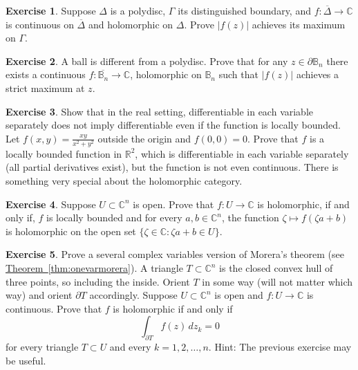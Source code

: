 \documentclass[12pt,openany]{book}
\newcommand{\sabs}[1]{\lvert {#1} \rvert}
\newcommand{\C}{{\mathbb{C}}}
\newcommand{\R}{{\mathbb{R}}}
\newcommand{\bB}{{\mathbb{B}}}
\theoremstyle{plain}
\theoremstyle{remark}
\theoremstyle{definition}
\newenvironment{exbox}{%
    \def\FrameCommand{\vrule width 1pt \relax\hspace {10pt}}%
    \MakeFramed {\advance \hsize -\width \FrameRestore }%
}{%
    \endMakeFramed
}
\theoremstyle{exercise}
\newtheorem{exercise}{Exercise}[section]
\theoremstyle{example}
\newcommand{\thmref}[1]{\hyperref[#1]{Theorem~\ref*{#1}}}
\begin{document}
\begin{exbox}
\begin{exercise}
Suppose $\Delta$ is a polydisc, $\Gamma$ its distinguished boundary,
and $f \colon \overline{\Delta} \to \C$ is continuous on $\overline{\Delta}$
and holomorphic on $\Delta$.
Prove
$\sabs{f(z)}$ achieves its maximum on $\Gamma$.
\end{exercise}

\begin{exercise}
A ball is different from a polydisc.  Prove that for any $z \in \partial \bB_n$
there exists a continuous $f \colon \overline{\bB_n} \to \C$, holomorphic
on $\bB_n$ such that $\sabs{f(z)}$ achieves a strict maximum at $z$.
\end{exercise}

\begin{exercise}
Show that in the real setting, differentiable
in each variable separately does not imply differentiable even if
the function is locally bounded.
Let $f(x,y) = \frac{xy}{x^2+y^2}$ outside the origin
and $f(0,0) = 0$.  Prove that $f$ is a
locally bounded function in $\R^2$, which is differentiable
in each variable separately (all partial derivatives exist), but 
the function is not even continuous.  There is something very
special about the holomorphic category.
\end{exercise}

\begin{exercise}
Suppose $U \subset \C^n$ is open.
Prove that $f \colon U \to \C$ is holomorphic, if and only if,
$f$ is locally bounded and
for every $a,b \in \C^n$, the
function
$\zeta \mapsto f(\zeta a + b)$ is holomorphic on
the open set $\{ \zeta \in \C : \zeta a + b \in U \}$.
\end{exercise}

\begin{exercise}
Prove a several complex variables version of Morera's theorem (see
\thmref{thm:onevarmorera}).
A triangle $T \subset \C^n$ is the closed convex hull of three points, so
including the inside.  Orient $T$ in some way (will not matter which way)
and orient $\partial T$ accordingly.
Suppose $U \subset \C^n$ is open and $f \colon U \to \C$ is continuous.
Prove that $f$ is holomorphic if and only if
\begin{equation*}
\int_{\partial T} f(z) \, dz_k = 0
\end{equation*}
for every triangle $T \subset U$ and every $k=1,2,\ldots,n$.
Hint: The previous exercise may be useful.
\end{exercise}
\end{exbox}
\end{document}
